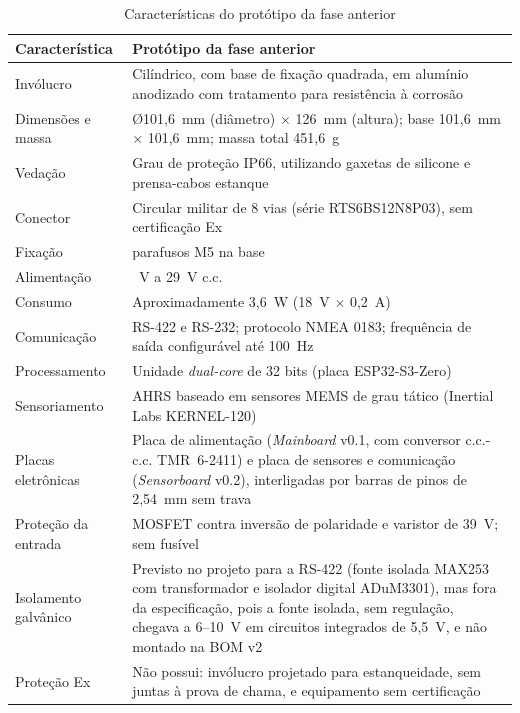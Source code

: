 \documentclass[a4paper, 12pt]{article}
\begin{document}
\begin{table}[H]
    \centering
    \caption{Características do protótipo da fase anterior}
    \label{tab:linhabase}
    \renewcommand{\arraystretch}{1.3}
    \begin{tabularx}{\textwidth}{|>{\raggedright\arraybackslash}p{3.6cm}|>{\raggedright\arraybackslash}X|}
        \hline
        \centering\arraybackslash\textbf{Característica} & \centering\arraybackslash\textbf{Protótipo da fase anterior} \\ \hline
        Invólucro & Cilíndrico, com base de fixação quadrada, em alumínio anodizado com tratamento para resistência à corrosão \\ \hline
        Dimensões e massa & \O101,6~mm (diâmetro) $\times$ 126~mm (altura); base 101,6~mm $\times$ 101,6~mm; massa total 451,6~g \\ \hline
        Vedação & Grau de proteção IP66, utilizando gaxetas de silicone e prensa-cabos estanque \\ \hline
        Conector & Circular militar de 8 vias (série RTS6BS12N8P03), sem certificação Ex \\ \hline
        Fixação & 4 parafusos M5 na base \\ \hline
        Alimentação & 16~V a 29~V c.c. \\ \hline
        Consumo & Aproximadamente 3,6~W (18~V $\times$ 0,2~A) \\ \hline
        Comunicação & RS-422 e RS-232; protocolo NMEA 0183; frequência de saída configurável até 100~Hz \\ \hline
        Processamento & Unidade \textit{dual-core} de 32 bits (placa ESP32-S3-Zero) \\ \hline
        Sensoriamento & AHRS baseado em sensores MEMS de grau tático (Inertial Labs KERNEL-120) \\ \hline
        Placas eletrônicas & Placa de alimentação (\textit{Mainboard} v0.1, com conversor c.c.-c.c. TMR~6-2411) e placa de sensores e comunicação (\textit{Sensorboard} v0.2), interligadas por barras de pinos de 2,54~mm sem trava \\ \hline
        Proteção da entrada & MOSFET contra inversão de polaridade e varistor de 39~V; sem fusível \\ \hline
        Isolamento galvânico & Previsto no projeto para a RS-422 (fonte isolada MAX253 com transformador e isolador digital ADuM3301), mas fora da especificação, pois a fonte isolada, sem regulação, chegava a 6--10~V em circuitos integrados de 5,5~V, e não montado na BOM v2 \\ \hline
        Proteção Ex & Não possui: invólucro projetado para estanqueidade, sem juntas à prova de chama, e equipamento sem certificação \\ \hline
    \end{tabularx}
\end{table}
\end{document}
